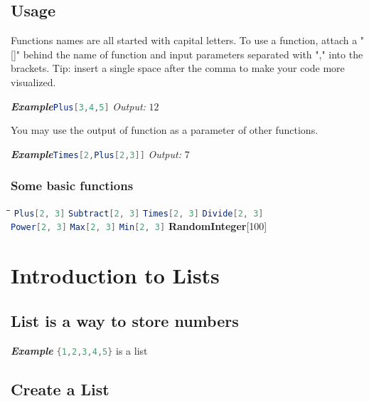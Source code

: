 \documentclass[a4paper]{book}
\begin{document}
\section{Usage}
Functions names are all started with capital letters. To use a function, attach a "[]" behind the name of function and input parameters separated with "," into the brackets. Tip: insert a single space after the comma to make your code more visualized.

\noindent\emph{\textbf{Example}}\quad \lstinline[language=Mathematica]|Plus[3,4,5]| \hspace{\fill}\emph{Output:} $12$

\noindent You may use the output of function as a parameter of other functions.

\noindent\emph{\textbf{Example}}\quad \lstinline[language=Mathematica]|Times[2,Plus[2,3]]| \hspace{\fill}\emph{Output:} $7$



\subsection{Some basic functions}
\begin{tabbing}
\hspace{0.25\linewidth}\=\hspace{0.25\linewidth}\=\hspace{0.25\linewidth}\=\kill
\lstinline[language=Mathematica]|Plus[2, 3]| \> \lstinline[language=Mathematica]|Subtract[2, 3]| \> \lstinline[language=Mathematica]|Times[2, 3]| \> \lstinline[language=Mathematica]|Divide[2, 3]| \\
\lstinline[language=Mathematica]|Power[2, 3]| \> \lstinline[language=Mathematica]|Max[2, 3]| \> \lstinline[language=Mathematica]|Min[2, 3]| \> \textbf{RandomInteger}[100] \\ 
\end{tabbing} 
\chapter{Introduction to Lists}
\section{List is a way to store numbers}
\emph{\textbf{Example}}\quad
\lstinline[language=Mathematica]|{1,2,3,4,5}| is a list
\section{Create a List}
\end{document}
